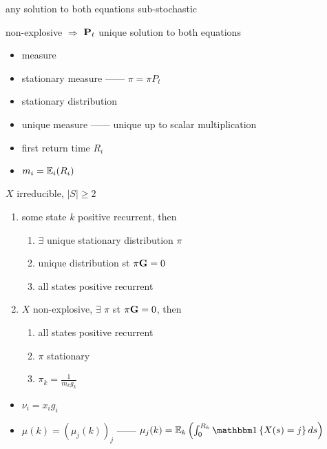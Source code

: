 \begin{fact}
    any solution to both equations sub-stochastic
\end{fact}

\begin{fact}
    non-explosive $\Rightarrow$ $\textbf{P}_t$ unique solution to both equations
\end{fact}

\begin{itemize}
    \item measure
    \item stationary measure ------ $\pi = \pi P_t$
    \item stationary distribution
    \item unique measure ------ unique up to scalar multiplication
    \item first return time $R_{i}$
    \item $m_i = \mathbb{E}_i(R_i)$
\end{itemize}

\begin{thm}
    $X$ irreducible, $|S|\geq 2$
    \begin{enumerate}
        \item some state $k$ positive recurrent, then
        \begin{enumerate}
            \item $\exists$ unique stationary distribution $\pi$
            \item unique distribution st $\pi \textbf{G} = 0$
            \item all states positive recurrent
        \end{enumerate}
        \item $X$ non-explosive, $\exists$ $\pi$ st $\pi \textbf{G} = 0$, then
        \begin{enumerate}
            \item all states positive recurrent
            \item $\pi$ stationary
            \item $\pi_k = \frac{1}{m_k g_k}$
        \end{enumerate}
    \end{enumerate}
\end{thm}

\begin{itemize}
    \item $\nu_i = x_i g_i$
    \item $\mu(k) = (\mu_j(k))_j$ ------ $\mu_j(k) = \Ex_k\left( \int^{R_k}_0 \In \left\{ X(s) = j \right\} ds \right)$
\end{itemize}

